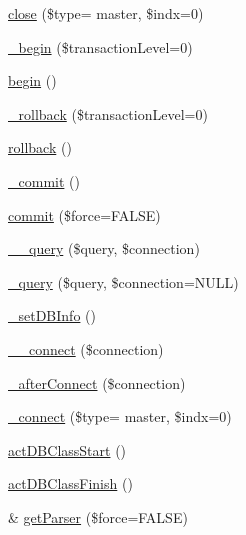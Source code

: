 \begin{DoxyCompactItemize}
\item 
\hyperlink{classDB_a99ab404981e46ae5b48e11ce46290500}{close} (\$type= \textquotesingle{}master\textquotesingle{}, \$indx=0)
\item 
\hyperlink{classDB_a3f032a017eee272090ea1ae5dba803e3}{\+\_\+begin} (\$transaction\+Level=0)
\item 
\hyperlink{classDB_a41aea6b3a6787467fcfd16d28a302c54}{begin} ()
\item 
\hyperlink{classDB_a5e766ca5cd5fc8dd24795b0846a8b89f}{\+\_\+rollback} (\$transaction\+Level=0)
\item 
\hyperlink{classDB_a1fb6903379bc241fd318b980b9e30882}{rollback} ()
\item 
\hyperlink{classDB_ae6b44dc80d78b7f73cb6741ff0d63399}{\+\_\+commit} ()
\item 
\hyperlink{classDB_a9e84ef91b522b1cd4d1f0f9a3fe3a57a}{commit} (\$force=F\+A\+L\+SE)
\item 
\hyperlink{classDB_a9e93ad499d34fefc40686d35ed9bf18f}{\+\_\+\+\_\+query} (\$query, \$connection)
\item 
\hyperlink{classDB_a740ea0f536b5ffacabf31b3a7473f5a7}{\+\_\+query} (\$query, \$connection=N\+U\+LL)
\item 
\hyperlink{classDB_a92f2478aeb03b00432332ad4e4a3d700}{\+\_\+set\+D\+B\+Info} ()
\item 
\hyperlink{classDB_a398b5d8142cab5920d3e037b4f22830e}{\+\_\+\+\_\+connect} (\$connection)
\item 
\hyperlink{classDB_ae9511581ab1229970e061e599b0f2f94}{\+\_\+after\+Connect} (\$connection)
\item 
\hyperlink{classDB_aaa2d517ff3b233e36c7873f288cb38ba}{\+\_\+connect} (\$type= \textquotesingle{}master\textquotesingle{}, \$indx=0)
\item 
\hyperlink{classDB_a5aa10d0d5f40cbd7c9b20a84b1c1c307}{act\+D\+B\+Class\+Start} ()
\item 
\hyperlink{classDB_abcdbf61ef5e7c96725c7ea2781f165f4}{act\+D\+B\+Class\+Finish} ()
\item 
\& \hyperlink{classDB_ac1222f2e7a1aae0fcd7d9e906a7a96ba}{get\+Parser} (\$force=F\+A\+L\+SE)
\end{DoxyCompactItemize}
